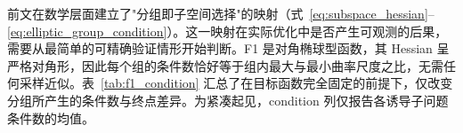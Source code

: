 前文在数学层面建立了"分组即子空间选择"的映射（式~\eqref{eq:subspace_hessian}--\eqref{eq:elliptic_group_condition}）。这一映射在实际优化中是否产生可观测的后果，需要从最简单的可精确验证情形开始判断。F1 是对角椭球型函数，其 Hessian 呈严格对角形，因此每个组的条件数恰好等于组内最大与最小曲率尺度之比，无需任何采样近似。表~\ref{tab:f1_condition} 汇总了在目标函数完全固定的前提下，仅改变分组所产生的条件数与终点差异。为紧凑起见，condition 列仅报告各诱导子问题条件数的均值。
